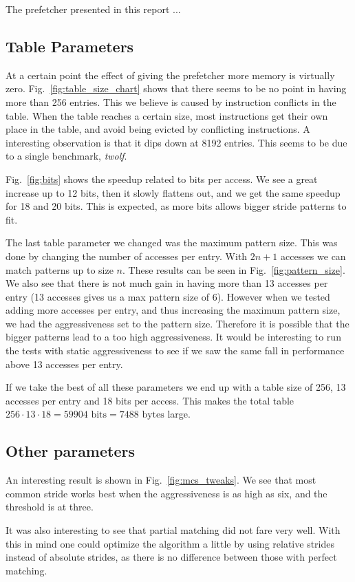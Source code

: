 The prefetcher presented in this report ...

\subsection{Table Parameters}
At a certain point the effect of giving the prefetcher more memory is virtually
zero. Fig.~\ref{fig:table_size_chart} shows that there seems to be no point in
having more than 256 entries. This we believe is caused by instruction
conflicts in the table. When the table reaches a certain size, most
instructions get their own place in the table, and avoid being evicted by
conflicting instructions.
A interesting observation is that it dips down at 8192 entries. This seems
to be due to a single benchmark, \emph{twolf}.

Fig.~\ref{fig:bits} shows the speedup related to bits per access.
We see a great increase up to 12 bits, then it slowly flattens out,
and we get the same speedup for 18 and 20 bits.
This is expected, as more bits allows bigger stride patterns to fit.

The last table parameter we changed was the maximum pattern size.
This was done by changing the number of accesses per entry.
With $2n+1$ accesses we can match patterns up to size $n$.
These results can be seen in Fig.~\ref{fig:pattern_size}.
We also see that there is not much gain in having more than 13
accesses per entry (13 accesses gives us a max pattern size of 6).
However when we tested adding more accesses per entry, and thus
increasing the maximum pattern size, we had the aggressiveness
set to the pattern size. Therefore it is possible that the bigger
patterns lead to a too high aggressiveness. It would be interesting
to run the tests with static aggressiveness to see if we saw the
same fall in performance above 13 accesses
per entry.

If we take the best of all these parameters we end up with a table size
of 256, 13 accesses per entry and 18 bits per access. This makes
the total table $256 \cdot 13 \cdot 18 = 59904 \textrm{ bits} = 7488 \textrm{ bytes}$ large.

\subsection{Other parameters}
An interesting result is shown in Fig.~\ref{fig:mcs_tweaks}.
We see that most common stride works best when the aggressiveness
is as high as six, and the threshold is at three.

It was also interesting to see that partial matching did not fare very well.
With this in mind one could optimize the algorithm a little by using relative
strides instead of absolute strides, as there is no difference between those
with perfect matching.
